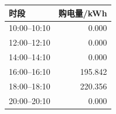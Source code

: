 \begin{tabular}{lr}
\toprule
时段 & 购电量/kWh \\
\midrule
10:00--10:10 & 0.000 \\
12:00--12:10 & 0.000 \\
14:00--14:10 & 0.000 \\
16:00--16:10 & 195.842 \\
18:00--18:10 & 220.356 \\
20:00--20:10 & 0.000 \\
\bottomrule
\end{tabular}
